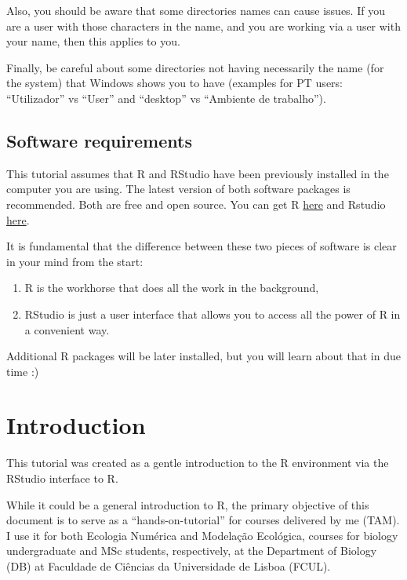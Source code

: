 \documentclass[
  letterpaper,
  DIV=11,
  numbers=noendperiod]{scrartcl}
\providecommand{\tightlist}{%
  \setlength{\itemsep}{0pt}\setlength{\parskip}{0pt}}
\begin{document}
Also, you should be aware that some directories names can cause issues.
If you are a user with those characters in the name, and you are working
via a user with your name, then this applies to you.

Finally, be careful about some directories not having necessarily the
name (for the system) that Windows shows you to have (examples for PT
users: ``Utilizador'' vs ``User'' and ``desktop'' vs ``Ambiente de
trabalho'').

\subsection{Software requirements}\label{software-requirements}

This tutorial assumes that R and RStudio have been previously installed
in the computer you are using. The latest version of both software
packages is recommended. Both are free and open source. You can get R
\href{https://www.r-project.org/}{here} and Rstudio
\href{https://www.rstudio.com/}{here}.

It is fundamental that the difference between these two pieces of
software is clear in your mind from the start:

\begin{enumerate}
\def\labelenumi{\arabic{enumi}.}
\tightlist
\item
  R is the workhorse that does all the work in the background,
\item
  RStudio is just a user interface that allows you to access all the
  power of R in a convenient way.
\end{enumerate}

Additional R packages will be later installed, but you will learn about
that in due time :)

\section{Introduction}\label{introduction}

This tutorial was created as a gentle introduction to the R environment
via the RStudio interface to R.

While it could be a general introduction to R, the primary objective of
this document is to serve as a ``hands-on-tutorial'' for courses
delivered by me (TAM). I use it for both Ecologia Numérica and Modelação
Ecológica, courses for biology undergraduate and MSc students,
respectively, at the Department of Biology (DB) at Faculdade de Ciências
da Universidade de Lisboa (FCUL).
\end{document}
